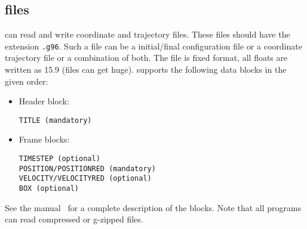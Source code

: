 \subsection{ files}
{\gromacs} can read and write  coordinate and trajectory files.
These files should have the extension {\tt .g96}.
Such a file can be a  initial/final
configuration file or a coordinate trajectory file or a combination of both.
The file is fixed format, all floats are written as 15.9 (files can get huge).
{\gromacs} supports the following data blocks in the given order:
\begin{itemize}
\item Header block:
\begin{verbatim}
TITLE (mandatory)
\end{verbatim}
\item Frame blocks:
\begin{verbatim}
TIMESTEP (optional)
POSITION/POSITIONRED (mandatory)
VELOCITY/VELOCITYRED (optional)
BOX (optional)
\end{verbatim}
\end{itemize}
See the  manual~\cite{gromos96} for a complete description of the
blocks. Note that all {\gromacs} programs can read compressed or g-zipped files.
